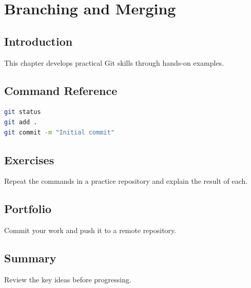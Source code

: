 \chapter{Branching and Merging}
\label{chap:vol2-7}



\section{Introduction}
This chapter develops practical Git skills through hands-on examples.

\section{Command Reference}
\begin{lstlisting}[language=bash]
git status
git add .
git commit -m "Initial commit"
\end{lstlisting}

\section{Exercises}
\begin{exercise}
Repeat the commands in a practice repository and explain the result of each.
\end{exercise}

\section{Portfolio}
Commit your work and push it to a remote repository.

\section{Summary}
Review the key ideas before progressing.
